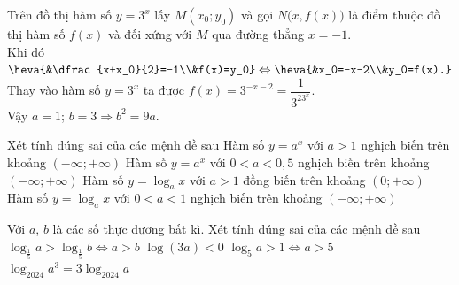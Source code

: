 \begin{ex}
{\begin{center}
\begin{tikzpicture}[line join=round,line cap=round,>=stealth]
				\end{tikzpicture}
		\end{center}
		Trên đồ thị hàm số $y=3^x$ lấy $M(x_0;y_0)$ và gọi $N\Big(x,f(x)\Big)$ là điểm thuộc đồ thị hàm số $f(x)$ và đối xứng với $M$ qua đường thẳng  $x=-1$.\\
		 Khi đó $\heva{&\dfrac{x+x_0}{2}=-1\\&f(x)=y_0}\Leftrightarrow \heva{&x_0=-x-2\\&y_0=f(x).}$\\
		 Thay vào hàm số $y=3^x$ ta được $f(x)=3^{-x-2}=\dfrac{1}{3^23^x}$.\\
		Vậy $a=1$;  $b=3\Rightarrow b^2=9a$.
	} 
\end{ex}

\begin{ex}%
 Xét tính đúng sai của các mệnh đề  sau
 \choiceTF 
  {Hàm số $y=a^x$ với $a>1$ nghịch biến trên khoảng $\left(-\infty;+\infty  \right)$}
  {\True Hàm số $y=a^x$ với $0<a<0{,}5$ nghịch  biến trên khoảng $(-\infty;+\infty)$}
   {\True Hàm số $y=\log_{a}x$ với $a>1$ đồng biến trên khoảng $(0;+\infty)$}
  {Hàm số $y=\log_{a}x$ với $0<a<1$ nghịch biến trên khoảng  $(-\infty;+\infty)$}
\end{ex}

\begin{ex}%
 Với $a$, $b$ là các số thực dương bất kì. Xét  tính đúng sai của các mệnh đề sau
 \choiceTF 
  {$\log_{\tfrac{1}{5}}a>\log_{\tfrac{1}{5}}b\Leftrightarrow  a>b$}
  {$\log (3a)<0$} 
  {\True $\log_{5}a>1\Leftrightarrow  a>5$}
  {\True  $\log_{2024}a^3=3\log_{2024}a$}
\end{ex}

